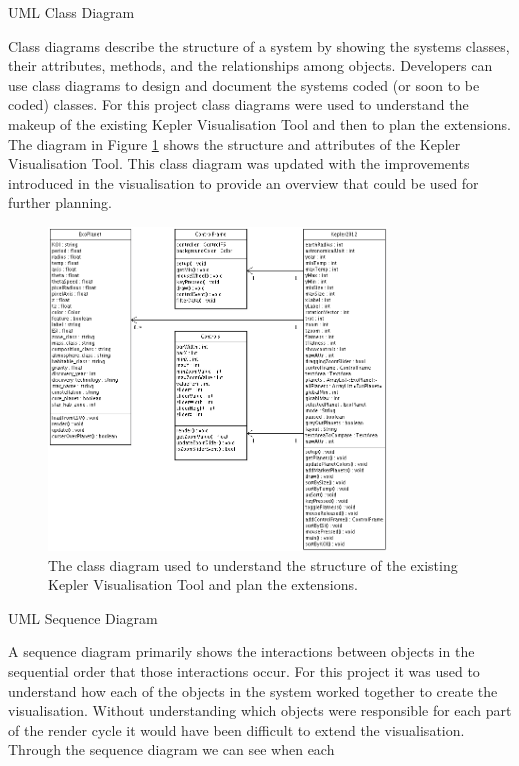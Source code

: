 \begin{enumerate}
\clearpage
 {\bf \item UML Class Diagram}
 Class diagrams describe the structure of a system by showing the systems
classes, their attributes, methods, and the relationships among objects.
 Developers can use class diagrams to design and document the systems coded (or
soon to be coded) classes. For this project class diagrams were used to
understand
the makeup of the existing Kepler Visualisation Tool and then to plan the
extensions. The diagram in Figure \ref{fig:classDiagram} shows the structure and
attributes of the Kepler Visualisation Tool. This class
diagram was updated with the improvements introduced in the visualisation
to provide an overview that could be used for further planning.
 \begin{figure}[H]
  \centering
      \includegraphics[width=0.8\textwidth]{images/classDiagram.png}
  \caption[Class Diagram of IKVT]{The class diagram used to understand
the structure of the existing Kepler Visualisation Tool and plan the
extensions.}  
  \label{fig:classDiagram}
\end{figure}
\clearpage
{\bf \item UML Sequence Diagram}
  A sequence diagram primarily shows the interactions between
objects in the sequential order that those interactions occur.
For this project it was used to understand how each of the objects in the system
worked together to create the visualisation. Without understanding which objects
were responsible for each part of the render cycle it would have been difficult
to extend the visualisation. Through the sequence diagram we can see when each

\end{enumerate}

